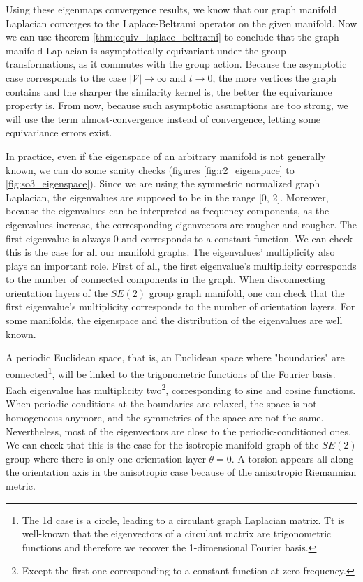 \documentclass{article}
\begin{document}
Using these eigenmaps convergence results, we know that our graph manifold Laplacian converges to the Laplace-Beltrami operator on the given manifold. Now we can use theorem \ref{thm:equiv_laplace_beltrami} to conclude that the graph manifold Laplacian is asymptotically equivariant under the group transformations, as it commutes with the group action. Because the asymptotic case corresponds to the case $|\mathcal{V}| \to \infty$ and $t \to 0$, the more vertices the graph contains and the sharper the similarity kernel is, the better the equivariance property is. From now, because such asymptotic assumptions are too strong, we will use the term almost-convergence instead of convergence, letting some equivariance errors exist.

In practice, even if the eigenspace of an arbitrary manifold is not generally known, we can do some sanity checks (figures \ref{fig:r2_eigenspace} to \ref{fig:so3_eigenspace}). Since we are using the symmetric normalized graph Laplacian, the eigenvalues are supposed to be in the range [0, 2]. Moreover, because the eigenvalues can be interpreted as frequency components, as the eigenvalues increase, the corresponding eigenvectors are rougher and rougher. The first eigenvalue is always 0 and corresponds to a constant function. We can check this is the case for all our manifold graphs. The eigenvalues' multiplicity also plays an important role. First of all, the first eigenvalue's multiplicity corresponds to the number of connected components in the graph. When disconnecting orientation layers of the $SE(2)$ group graph manifold, one can check that the first eigenvalue's multiplicity corresponds to the number of orientation layers. For some manifolds, the eigenspace and the distribution of the eigenvalues are well known. 

A periodic Euclidean space, that is, an Euclidean space where "boundaries" are connected\footnote{The 1d case is a circle, leading to a circulant graph Laplacian matrix. Tt is well-known that the eigenvectors of a circulant matrix are trigonometric functions and therefore we recover the 1-dimensional Fourier basis.}, will be linked to the trigonometric functions of the Fourier basis. Each eigenvalue has multiplicity two\footnote{Except the first one corresponding to a constant function at zero frequency.}, corresponding to sine and cosine functions. When periodic conditions at the boundaries are relaxed, the space is not homogeneous anymore, and the symmetries of the space are not the same. Nevertheless, most of the eigenvectors are close to the periodic-conditioned ones. We can check that this is the case for the isotropic manifold graph of the $SE(2)$ group where there is only one orientation layer $\theta = 0$. A torsion appears all along the orientation axis in the anisotropic case because of the anisotropic Riemannian metric. 
\end{document}
